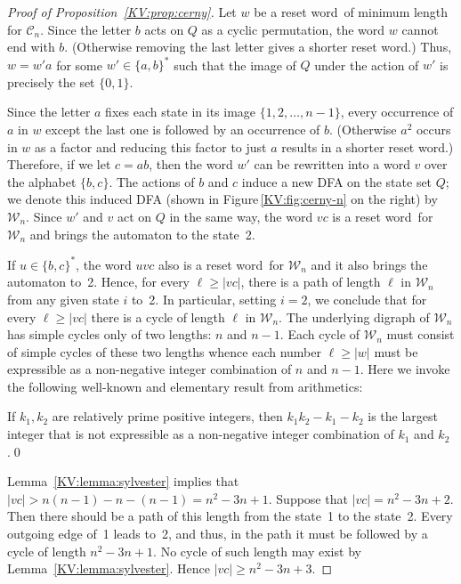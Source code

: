 \documentclass{irmaart}
\newcommand{\sw}{reset word}
\theoremstyle{plain}
\begin{document}
\begin{proof}[Proof of Proposition~\ref{KV:prop:cerny}]
Let $w$ be a \sw\ of minimum length for $\mathcal{C}_n$. Since the letter $b$
acts on $Q$ as a cyclic permutation, the word $w$ cannot end with $b$.
(Otherwise removing the last letter gives a shorter \sw.) Thus, $w = w'a$ for
some $w'\in\{a,b\}^*$ such that the image of $Q$ under the action of $w'$ is
precisely the set $\{0,1\}$.

Since the letter $a$ fixes each state in its image
$\{1,2,\dots,n-1\}$, every occurrence of $a$ in $w$ except the
last one is followed by an occurrence of $b$. (Otherwise $a^2$
occurs in $w$ as a factor and reducing this factor to just $a$
results in a shorter \sw.) Therefore, if we let $c=ab$, then the
word $w'$ can be rewritten into a word $v$ over the alphabet
$\{b,c\}$. The actions of $b$ and $c$ induce a new DFA on the
state set $Q$; we denote this induced DFA (shown in
Figure\,\ref{KV:fig:cerny-n} on the right) by $\mathcal{W}_n$.
Since $w'$ and $v$ act on $Q$ in the same way, the word $vc$ is a
\sw\ for $\mathcal{W}_n$ and brings the automaton to the state~2.

If $u\in\{b,c\}^*$, the word $uvc$ also is a \sw\ for $\mathcal{W}_n$ and it
also brings the automaton to~2. Hence, for every $\ell\ge|vc|$, there is a path
of length $\ell$ in $\mathcal{W}_n$ from any given state $i$ to~2. In
particular, setting $i=2$, we conclude that for every $\ell\ge|vc|$ there is a
cycle of length $\ell$ in $\mathcal{W}_n$. The underlying digraph of
$\mathcal{W}_n$ has simple cycles only of two lengths: $n$ and $n-1$. Each
cycle of $\mathcal{W}_n$ must consist of simple cycles of these two lengths
whence each number $\ell\ge|w|$ must be expressible as a non-negative integer
combination of $n$ and $n-1$. Here we invoke the following well-known and
elementary result from arithmetics:

\begin{lemma}
\label{KV:lemma:sylvester} If $k_1,k_2$ are relatively prime positive integers,
then $k_1k_2-k_1-k_2$ is the largest integer that is not expressible as a
non-negative integer combination of $k_1$ and $k_2$.\qed
\end{lemma}

Lemma~\ref{KV:lemma:sylvester} implies that
$|vc|>n(n-1)-n-(n-1)=n^2-3n+1$. Suppose that $|vc|=n^2-3n+2$. Then
there should be a path of this length from the state~1 to the
state~2. Every outgoing edge of~1 leads to~2, and thus, in the
path it must be followed by a cycle of length $n^2-3n+1$. No cycle
of such length may exist by Lemma~\ref{KV:lemma:sylvester}. Hence
$|vc|\ge n^2-3n+3$.


\end{proof}
\end{document}

